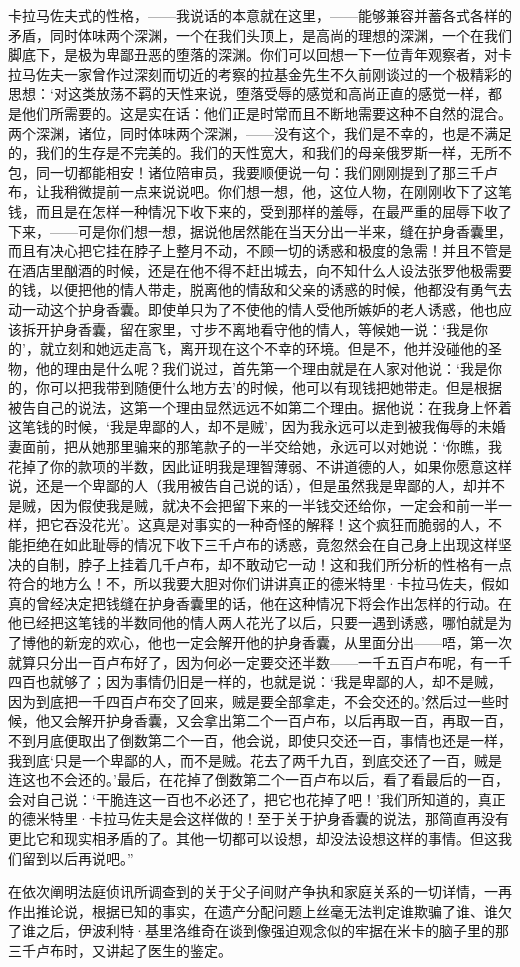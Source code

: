 卡拉马佐夫式的性格，——我说话的本意就在这里，——能够兼容并蓄各式各样的矛盾，同时体味两个深渊，一个在我们头顶上，是高尚的理想的深渊，一个在我们脚底下，是极为卑鄙丑恶的堕落的深渊。你们可以回想一下一位青年观察者，对卡拉马佐夫一家曾作过深刻而切近的考察的拉基金先生不久前刚谈过的一个极精彩的思想：‘对这类放荡不羁的天性来说，堕落受辱的感觉和高尚正直的感觉一样，都是他们所需要的。这是实在话：他们正是时常而且不断地需要这种不自然的混合。两个深渊，诸位，同时体味两个深渊，——没有这个，我们是不幸的，也是不满足的，我们的生存是不完美的。我们的天性宽大，和我们的母亲俄罗斯一样，无所不包，同一切都能相安！诸位陪审员，我要顺便说一句：我们刚刚提到了那三千卢布，让我稍微提前一点来说说吧。你们想一想，他，这位人物，在刚刚收下了这笔钱，而且是在怎样一种情况下收下来的，受到那样的羞辱，在最严重的屈辱下收了下来，——可是你们想一想，据说他居然能在当天分出一半来，缝在护身香囊里，而且有决心把它挂在脖子上整月不动，不顾一切的诱惑和极度的急需！并且不管是在酒店里酗酒的时候，还是在他不得不赶出城去，向不知什么人设法张罗他极需要的钱，以便把他的情人带走，脱离他的情敌和父亲的诱惑的时候，他都没有勇气去动一动这个护身香囊。即使单只为了不使他的情人受他所嫉妒的老人诱惑，他也应该拆开护身香囊，留在家里，寸步不离地看守他的情人，等候她一说：‘我是你的’，就立刻和她远走高飞，离开现在这个不幸的环境。但是不，他并没碰他的圣物，他的理由是什么呢？我们说过，首先第一个理由就是在人家对他说：‘我是你的，你可以把我带到随便什么地方去’的时候，他可以有现钱把她带走。但是根据被告自己的说法，这第一个理由显然远远不如第二个理由。据他说：在我身上怀着这笔钱的时候，‘我是卑鄙的人，却不是贼’，因为我永远可以走到被我侮辱的未婚妻面前，把从她那里骗来的那笔款子的一半交给她，永远可以对她说：‘你瞧，我花掉了你的款项的半数，因此证明我是理智薄弱、不讲道德的人，如果你愿意这样说，还是一个卑鄙的人（我用被告自己说的话），但是虽然我是卑鄙的人，却并不是贼，因为假使我是贼，就决不会把留下来的一半钱交还给你，一定会和前一半一样，把它吞没花光’。这真是对事实的一种奇怪的解释！这个疯狂而脆弱的人，不能拒绝在如此耻辱的情况下收下三千卢布的诱惑，竟忽然会在自己身上出现这样坚决的自制，脖子上挂着几千卢布，却不敢动它一动！这和我们所分析的性格有一点符合的地方么！不，所以我要大胆对你们讲讲真正的德米特里·卡拉马佐夫，假如真的曾经决定把钱缝在护身香囊里的话，他在这种情况下将会作出怎样的行动。在他已经把这笔钱的半数同他的情人两人花光了以后，只要一遇到诱惑，哪怕就是为了博他的新宠的欢心，他也一定会解开他的护身香囊，从里面分出——唔，第一次就算只分出一百卢布好了，因为何必一定要交还半数——一千五百卢布呢，有一千四百也就够了；因为事情仍旧是一样的，也就是说：‘我是卑鄙的人，却不是贼，因为到底把一千四百卢布交了回来，贼是要全部拿走，不会交还的。’然后过一些时候，他又会解开护身香囊，又会拿出第二个一百卢布，以后再取一百，再取一百，不到月底便取出了倒数第二个一百，他会说，即使只交还一百，事情也还是一样，我到底‘只是一个卑鄙的人，而不是贼。花去了两千九百，到底交还了一百，贼是连这也不会还的。’最后，在花掉了倒数第二个一百卢布以后，看了看最后的一百，会对自己说：‘干脆连这一百也不必还了，把它也花掉了吧！’我们所知道的，真正的德米特里·卡拉马佐夫是会这样做的！至于关于护身香囊的说法，那简直再没有更比它和现实相矛盾的了。其他一切都可以设想，却没法设想这样的事情。但这我们留到以后再说吧。”
\par 在依次阐明法庭侦讯所调查到的关于父子间财产争执和家庭关系的一切详情，一再作出推论说，根据已知的事实，在遗产分配问题上丝毫无法判定谁欺骗了谁、谁欠了谁之后，伊波利特·基里洛维奇在谈到像强迫观念似的牢据在米卡的脑子里的那三千卢布时，又讲起了医生的鉴定。
